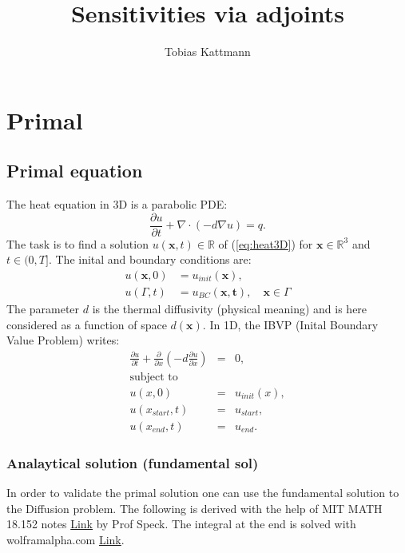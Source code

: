 \documentclass[10pt]{article}
\begin{document}
\title{Sensitivities via adjoints}
\author{Tobias Kattmann}
\maketitle
\tableofcontents

\section{Primal}
\subsection{Primal equation}
The heat equation in 3D is a parabolic PDE:
\begin{equation}\label{eq:heat3D}
\frac{\partial u}{\partial t} + \nabla\cdot \left(- d\nabla u \right) = q.
\end{equation}
The task is to find a solution $u\left(\mathbf{x}, t\right)\in\mathbb{R}$ of  (\ref{eq:heat3D}) for $\mathbf{x}\in\mathbb{R}^3$ and $t\in(0,T]$. The inital and boundary conditions are:
\begin{align}
u(\mathbf{x},0) & = u_{init}(\mathbf{x}), \\
u(\Gamma,t) & = u_{BC}(\mathbf{x,t}), \quad \mathbf{x}\in\Gamma
\end{align}
The parameter $d$ is the thermal diffusivity (physical meaning) and is here considered as a function of space $d\left(\mathbf{x}\right)$. In 1D, the IBVP (Inital Boundary Value Problem) writes:
\begin{eqnarray}
\frac{\partial u}{\partial t} +\frac{\partial}{\partial x} \left(- d \frac{\partial u}{\partial x}  \right) &=& 0, \\
\text{subject to} \\
u(x,0) &=& u_{init}(x), \\
u(x_{start},t)&=& u_{start}, \\
u(x_{end},t) &=& u_{end}.
\end{eqnarray}
\subsubsection{Analaytical solution (fundamental sol)}
In order to validate the primal solution one can use the fundamental solution to the Diffusion problem. The following is derived with the help of MIT MATH 18.152 notes \href{http://math.mit.edu/~jspeck/18.152_Fall2011/Lecture%20notes/18152%20lecture%20notes%20-%205.pdf}{Link} by Prof Speck. The integral at the end is solved with wolframalpha.com \href{https://sandbox.open.wolframcloud.com/app/objects/a62c75f0-0ef8-44e4-8ba9-4eedb585f643#sidebar=compute}{Link}.
	
\end{document}
